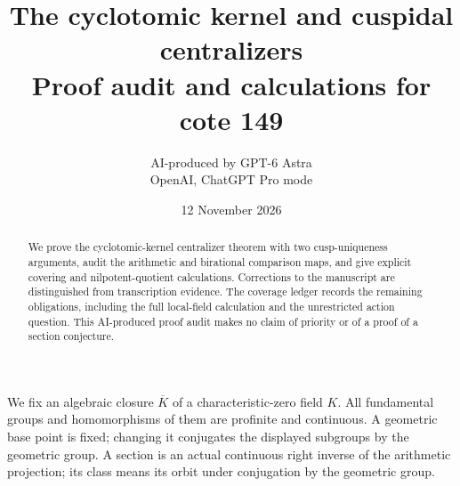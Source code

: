 \documentclass[11pt,a4paper]{article}
\title{The cyclotomic kernel and cuspidal centralizers\\\large Proof audit and calculations for cote 149}
\author{AI-produced by GPT-6 Astra\\OpenAI, ChatGPT Pro mode}
\date{12 November 2026}
\begin{document}
\maketitle
\begin{abstract}
We prove the cyclotomic-kernel centralizer theorem with two cusp-uniqueness arguments, audit the arithmetic and birational comparison maps, and give explicit covering and nilpotent-quotient calculations. Corrections to the manuscript are distinguished from transcription evidence. The coverage ledger records the remaining obligations, including the full local-field calculation and the unrestricted action question. This AI-produced proof audit makes no claim of priority or of a proof of a section conjecture.
\end{abstract}

We fix an algebraic closure $\overline K$ of a characteristic-zero field $K$. All fundamental groups and homomorphisms of them are profinite and continuous. A geometric base point is fixed; changing it conjugates the displayed subgroups by the geometric group. A section is an actual continuous right inverse of the arithmetic projection; its class means its orbit under conjugation by the geometric group.
\end{document}
